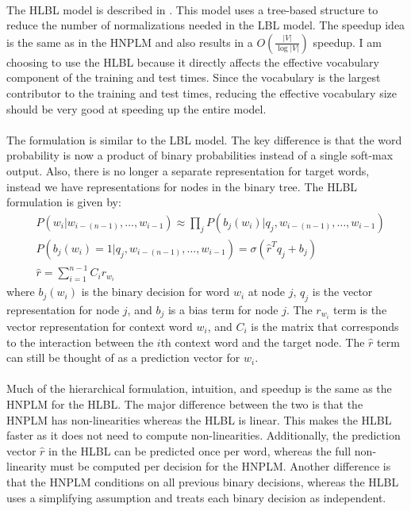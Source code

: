 \paragraph{}
The HLBL model is described in \cite{MnihHinton2009}. This model uses a tree-based structure to reduce the number of normalizations needed in the LBL model. The speedup idea is the same as in the HNPLM and also results in a $O(\frac{|V|}{\log|V|})$ speedup. I am choosing to use the HLBL because it directly affects the effective vocabulary component of the training and test times. Since the vocabulary is the largest contributor to the training and test times, reducing the effective vocabulary size should be very good at speeding up the entire model.

\paragraph{}
The formulation is similar to the LBL model. The key difference is that the word probability is now a product of binary probabilities instead of a single soft-max output. Also, there is no longer a separate representation for target words, instead we have representations for nodes in the binary tree. The HLBL formulation is given by:
\begin{align}
&P(w_i | w_{i-(n-1)},\dots, w_{i-1})  \approx \prod_j P(b_j(w_i) | q_j, w_{i-(n-1)},\dots, w_{i-1}) \label{eq:HLBL}
\\ 
&P(b_j(w_i) = 1 | q_j, w_{i-(n-1)},\dots, w_{i-1}) =  \sigma( \hat{r}^T q_{j} +b_{j})
\\ 
&\hat{r} = \sum_{i=1}^{n-1} C_i r_{w_i} \nonumber
\end{align}
where $b_j(w_i)$ is the binary decision for word $w_i$ at node $j$, $q_j$ is the vector representation for node $j$, and $b_{j}$ is a bias term for node $j$. The $r_{w_i}$ term is the vector representation for context word $w_i$, and $C_i$ is the matrix that corresponds to the interaction between the $i$th context word and the target node.  The $\hat{r}$ term can still be thought of as a prediction vector for $w_i$. 

\paragraph{}
Much of the hierarchical formulation, intuition, and speedup is the same as the HNPLM for the HLBL. The major difference between the two is that the HNPLM has non-linearities whereas the HLBL is linear. This makes the HLBL faster as it does not need to compute non-linearities. Additionally, the prediction vector $\hat{r}$ in the HLBL can be predicted once per word, whereas the full non-linearity must be computed per decision for the HNPLM. Another difference is that the HNPLM conditions on all previous binary decisions, whereas the HLBL uses a simplifying assumption and treats each binary decision as independent. 


